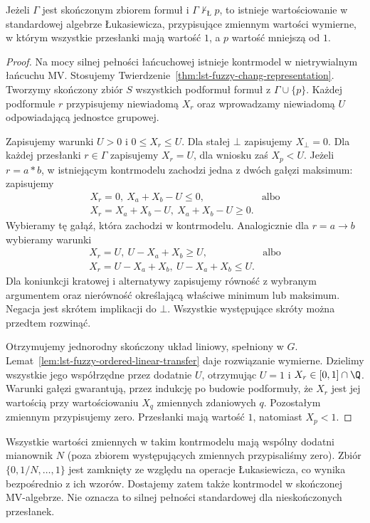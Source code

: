 \begin{twierdzenie}
\label{thm:lst-fuzzy-mv-rational-countermodel}
Jeżeli $\Gamma$ jest skończonym zbiorem formuł i
$\Gamma\nvdash_{\text{\L}}p$, to istnieje
wartościowanie w standardowej algebrze Łukasiewicza,
przypisujące zmiennym wartości wymierne, w którym
wszystkie przesłanki mają wartość $1$, a $p$ wartość
mniejszą od $1$.
\end{twierdzenie}
\begin{proof}
Na mocy silnej pełności łańcuchowej istnieje kontrmodel
w nietrywialnym łańcuchu MV. Stosujemy
Twierdzenie~\ref{thm:lst-fuzzy-chang-representation}.
Tworzymy skończony zbiór $S$ wszystkich podformuł
formuł z $\Gamma\cup\{p\}$. Każdej podformule $r$
przypisujemy niewiadomą $X_r$ oraz wprowadzamy
niewiadomą $U$ odpowiadającą jednostce grupowej.

Zapisujemy warunki $U>0$ i $0\leq X_r\leq U$.
Dla stałej $\bot$ zapisujemy $X_\bot=0$.
Dla każdej przesłanki $r\in\Gamma$ zapisujemy
$X_r=U$, dla wniosku zaś $X_p<U$.
Jeżeli $r=a*b$, w istniejącym kontrmodelu zachodzi
jedna z dwóch gałęzi maksimum: zapisujemy
\[
\begin{array}{ll}
 X_r=0,\ X_a+X_b-U\leq0, &\text{albo}\\
 X_r=X_a+X_b-U,\ X_a+X_b-U\geq0.
\end{array}
\]
Wybieramy tę gałąź, która zachodzi w kontrmodelu.
Analogicznie dla $r=a\to b$ wybieramy warunki
\[
\begin{array}{ll}
 X_r=U,\ U-X_a+X_b\geq U, &\text{albo}\\
 X_r=U-X_a+X_b,\ U-X_a+X_b\leq U.
\end{array}
\]
Dla koniunkcji kratowej i alternatywy zapisujemy
równość z wybranym argumentem oraz nierówność
określającą właściwe minimum lub maksimum.
Negacja jest skrótem implikacji do $\bot$.
Wszystkie występujące skróty można przedtem rozwinąć.

Otrzymujemy jednorodny skończony układ liniowy,
spełniony w $G$. Lemat~\ref{lem:lst-fuzzy-ordered-linear-transfer}
daje rozwiązanie wymierne. Dzielimy wszystkie jego
współrzędne przez dodatnie $U$, otrzymując
$U=1$ i $X_r\in[0,1]\cap\Q$.
Warunki gałęzi gwarantują, przez indukcję po budowie
podformuły, że $X_r$ jest jej wartością przy
wartościowaniu $X_q$ zmiennych zdaniowych $q$.
Pozostałym zmiennym przypisujemy zero.
Przesłanki mają wartość $1$, natomiast $X_p<1$.
\end{proof}
Wszystkie wartości zmiennych w takim kontrmodelu
mają wspólny dodatni mianownik $N$ (poza zbiorem
występujących zmiennych przypisaliśmy zero).
Zbiór $\{0,1/N,\ldots,1\}$ jest zamknięty ze względu
na operacje Łukasiewicza, co wynika bezpośrednio
z ich wzorów. Dostajemy zatem także kontrmodel
w skończonej MV-algebrze. Nie oznacza to silnej
pełności standardowej dla nieskończonych przesłanek.

